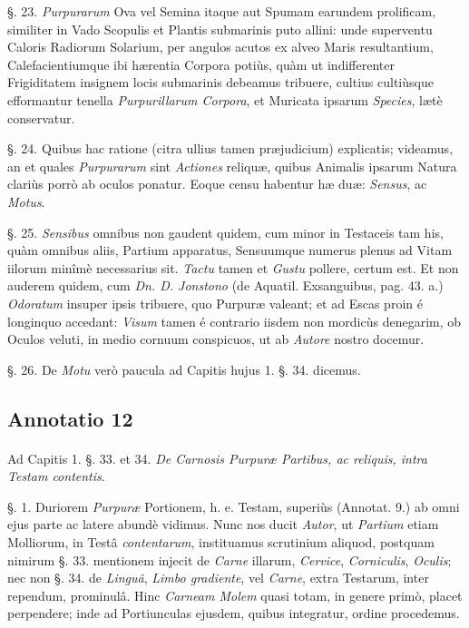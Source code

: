 \documentclass[a4paper, 11pt, oneside, polutonikogreek, german]{article}
\begin{document}
§. 23. \emph{Purpurarum} Ova vel Semina itaque aut Spumam earundem prolificam, similiter in Vado Scopulis et Plantis submarinis puto allini: unde superventu Caloris Radiorum Solarium, per angulos acutos ex alveo Maris resultantium, Calefacientiumque ibi hærentia Corpora potiùs, quàm ut indifferenter Frigiditatem insignem locis submarinis debeamus tribuere, cultius cultiùsque efformantur tenella \emph{Purpurillarum Corpora}, et Muricata ipsarum \emph{Species}, lætè conservatur.

§. 24. Quibus hac ratione (citra ullius tamen præjudicium) explicatis; videamus, an et quales \emph{Purpurarum} sint \emph{Actiones} reliquæ, quibus Animalis ipsarum Natura clariùs porrò ab oculos ponatur. Eoque censu habentur hæ duæ: \emph{Sensus}, ac \emph{Motus}.

§. 25. \emph{Sensibus} omnibus non gaudent quidem, cum minor in Testaceis tam his, quàm omnibus aliis, Partium apparatus, Sensuumque numerus plenus ad Vitam iilorum minîmè necessarius sit. \emph{Tactu} tamen et \emph{Gustu} pollere, certum est. Et non auderem quidem, cum \emph{Dn. D. Jonstono} (de Aquatil. Exsanguibus, pag. 43. a.) \emph{Odoratum} insuper ipsis tribuere, quo Purpuræ valeant; et ad Escas proin é longinquo accedant: \emph{Visum} tamen é contrario iisdem non mordicùs denegarim, ob Oculos veluti, in medio cornuum conspicuos, ut ab \emph{Autore} nostro docemur.

§. 26. De \emph{Motu} verò paucula ad Capitis hujus 1. §. 34. dicemus.

\subsection{Annotatio 12}
\paragraph{}
Ad Capitis 1. §. 33. et 34. \emph{De Carnosis Purpuræ Partibus, ac reliquis, intra Testam contentis}.

§. 1. Duriorem \emph{Purpuræ} Portionem, h. e. Testam, superiùs (Annotat. 9.) ab omni ejus parte ac latere abundè vidimus. Nunc nos ducit \emph{Autor}, ut \emph{Partium} etiam Molliorum, in Testâ \emph{contentarum}, instituamus scrutinium aliquod, postquam nimirum §. 33. mentionem injecit de \emph{Carne} illarum, \emph{Cervice}, \emph{Corniculis}, \emph{Oculis}; nec non §. 34. de \emph{Linguâ}, \emph{Limbo gradiente}, vel \emph{Carne}, extra Testarum, inter rependum, prominulâ. Hinc \emph{Carneam Molem} quasi totam, in genere primò, placet perpendere; inde ad Portiunculas ejusdem, quibus integratur, ordine procedemus.
\end{document}
